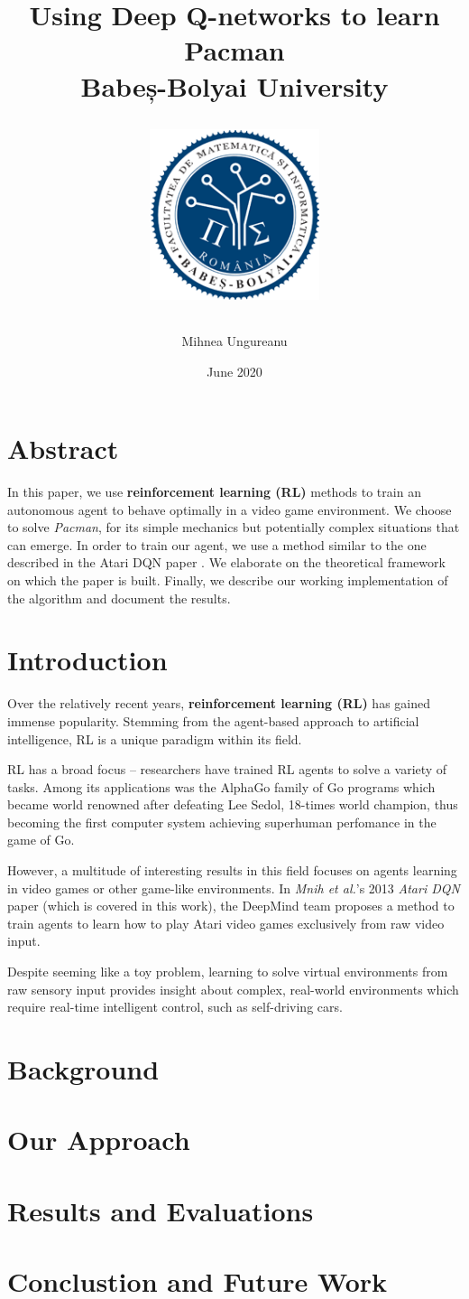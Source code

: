 \documentclass[12pt,twoside]{report}
\title{
    {Using Deep Q-networks to learn Pacman}\\
    {\large Babeș-Bolyai University}\\
    {
        \begin{figure}[h]
            \includegraphics[width=5cm]{logo_cs.png}
            \centering
        \end{figure}
    }
}
\author{Mihnea Ungureanu}
\date{June 2020}
\begin{document}
\maketitle

\chapter*{Abstract}
In this paper, we use \textbf{reinforcement learning (RL)} methods to train an autonomous agent to behave optimally in a video game environment.
We choose to solve \emph{Pacman}, for its simple mechanics but potentially complex situations that can emerge.
In order to train our agent, we use a method similar to the one described in the Atari DQN paper \cite{atari-dqn}.
We elaborate on the theoretical framework on which the paper is built.
Finally, we describe our working implementation of the algorithm and document the results.

\chapter*{Introduction}
Over the relatively recent years, \textbf{reinforcement learning (RL)} has gained immense popularity.
Stemming from the agent-based approach to artificial intelligence, RL is a unique paradigm within its field.

RL has a broad focus -- researchers have trained RL agents to solve a variety of tasks.
Among its applications was the AlphaGo family of Go programs \cite{ago, alpha-zero} which became world renowned after defeating Lee Sedol, 18-times world champion, thus becoming the first computer system achieving superhuman perfomance in the game of Go.

However, a multitude of interesting results in this field focuses on agents learning in video games or other game-like environments.
In \emph{Mnih et al.}'s 2013 \emph{Atari DQN} paper \cite{atari-dqn} (which is covered in this work), the DeepMind team proposes a method to train agents to learn how to play Atari video games exclusively from raw video input.

Despite seeming like a toy problem, learning to solve virtual environments from raw sensory input provides insight about complex, real-world environments which require real-time intelligent control, such as self-driving cars.

\tableofcontents

\chapter{Background}


\chapter{Our Approach}


\chapter{Results and Evaluations}


\chapter{Conclustion and Future Work}



\end{document}
